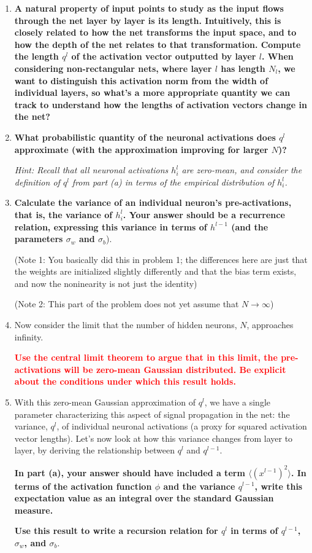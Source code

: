 \documentclass[a4paper]{article}
\begin{document}
\begin{enumerate}[label=(\alph*)]
\item \textbf{A natural property of input points to study as the input flows through the net layer by layer is its length. Intuitively, this is closely related to how the net transforms the input space, and to how the depth of the net relates to that transformation. Compute the length $q^l$ of the activation vector outputted by layer $l$. When considering non-rectangular nets, where layer $l$ has length $N_l$, we want to distinguish this activation norm from the width of individual layers, so what's a more appropriate quantity we can track to understand how the lengths of activation vectors change in the net?}

\item \textbf{What probabilistic quantity of the neuronal activations does $q^l$ approximate (with the approximation improving for larger $N$)?}

\textit{Hint: Recall that all neuronal activations $h^l_i$ are zero-mean, and consider the definition of $q^l$ from part (a) in terms of the empirical distribution of $h^l_i$.}

\item \textbf{Calculate the variance of an individual neuron's pre-activations, that is, the variance of $h_i^l$.  Your answer should be a recurrence relation, expressing this variance in terms of $h^{l-1}$ (and the parameters $\sigma_w$ and $\sigma_b$}).

(Note 1: You basically did this in problem 1; the differences here are just that the weights are initialized slightly differently and that the bias term exists, and now the noninearity is not just the identity)

(Note 2: This part of the problem does not yet assume that $N\rightarrow \infty$)

\item Now consider the limit that the number of hidden neurons, $N$, approaches infinity.  

\textcolor{red}

\textbf{Use the central limit theorem to argue that in this limit, the pre-activations will be zero-mean Gaussian distributed. Be explicit about the conditions under which this result holds.}

\item With this zero-mean Gaussian approximation of $q^l$, we have a single parameter characterizing this aspect of signal propagation in the net: the variance, $q^l$, of individual neuronal activations (a proxy for squared activation vector lengths). Let's now look at how this variance changes from layer to layer, by deriving the relationship between $q^l$ and $q^{l - 1}$.

\textbf{In part (a), your answer should have included a term $\langle (x^{l-1})^2 \rangle$.  In terms of the activation function $\phi$ and the variance $q^{l-1}$, write this expectation value as an integral over the standard Gaussian measure.}

\textbf{Use this result to write a recursion relation for $q^l$ in  terms of $q^{l-1}$, $\sigma_w$, and $\sigma_b$}.

\end{enumerate}
\end{document}
